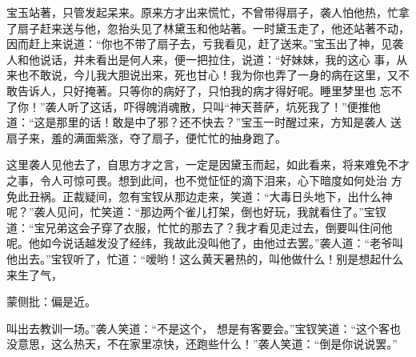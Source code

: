 \begin{parag}


    宝玉站著，只管发起呆来。原来方才出来慌忙，不曾带得扇子，袭人怕他热，忙拿了扇子赶来送与他，忽抬头见了林黛玉和他站著。一时黛玉走了，他还站著不动，因而赶上来说道：“你也不带了扇子去，亏我看见，赶了送来。”宝玉出了神，见袭人和他说话，并未看出是何人来，便一把拉住，说道：“好妹妹，我的这心 事，从来也不敢说，今儿我大胆说出来，死也甘心！我为你也弄了一身的病在这里，又不敢告诉人，只好掩著。只等你的病好了，只怕我的病才得好呢。睡里梦里也 忘不了你！”袭人听了这话，吓得魄消魂散，只叫“神天菩萨，坑死我了！”便推他道：“这是那里的话！敢是中了邪？还不快去？”宝玉一时醒过来，方知是袭人 送扇子来，羞的满面紫涨，夺了扇子，便忙忙的抽身跑了。
\end{parag}


\begin{parag}


    这里袭人见他去了，自思方才之言，一定是因黛玉而起，如此看来，将来难免不才之事，令人可惊可畏。想到此间，也不觉怔怔的滴下泪来，心下暗度如何处治 方免此丑祸。正裁疑间，忽有宝钗从那边走来，笑道：“大毒日头地下，出什么神呢？”袭人见问，忙笑道：“那边两个雀儿打架，倒也好玩，我就看住了。”宝钗道：“宝兄弟这会子穿了衣服，忙忙的那去了？我才看见走过去，倒要叫住问他呢。他如今说话越发没了经纬，我故此没叫他了，由他过去罢。”袭人道：“老爷叫 他出去。”宝钗听了，忙道：“嗳哟！这么黄天暑热的，叫他做什么！别是想起什么来生了气，\begin{note}蒙侧批：偏是近。\end{note}叫出去教训一场。”袭人笑道：“不是这个， 想是有客要会。”宝钗笑道：“这个客也没意思，这么热天，不在家里凉快，还跑些什么！”袭人笑道：“倒是你说说罢。”
\end{parag}



